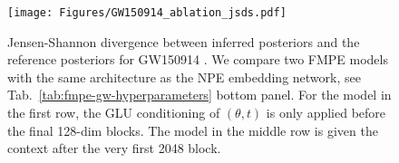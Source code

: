 \documentclass{article}
\theoremstyle{remark}
\begin{document}
\begin{figure}[ht]
  \vspace{-5pt}
  \centering
  \texttt{[image: Figures/GW150914\_ablation\_jsds.pdf]}
  \vspace{-5pt}
  \caption{\label{fig:jsds-ablation} Jensen-Shannon divergence between inferred posteriors and the reference posteriors for GW150914 \cite{Abbott:2016blz}. We compare two FMPE models with the same architecture as the NPE embedding network, see Tab.~\ref{tab:fmpe-gw-hyperparameters} bottom panel. For the model in the first row, the GLU conditioning of $(\theta, t)$ is only applied before the final 128-dim blocks. The model in the middle row is given the context after the very first 2048 block.}
\end{figure}
\end{document}
